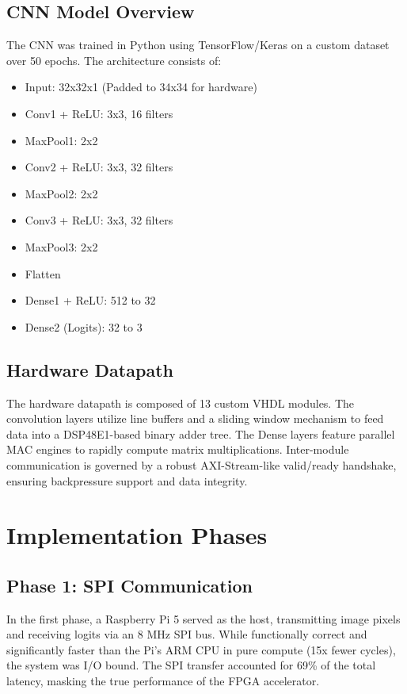 \documentclass[12pt,a4paper]{article}
\begin{document}
\subsection{CNN Model Overview}
The CNN was trained in Python using TensorFlow/Keras on a custom dataset over 50 epochs. The architecture consists of:
\begin{itemize}
    \item Input: 32x32x1 (Padded to 34x34 for hardware)
    \item Conv1 + ReLU: 3x3, 16 filters
    \item MaxPool1: 2x2
    \item Conv2 + ReLU: 3x3, 32 filters
    \item MaxPool2: 2x2
    \item Conv3 + ReLU: 3x3, 32 filters
    \item MaxPool3: 2x2
    \item Flatten
    \item Dense1 + ReLU: 512 to 32
    \item Dense2 (Logits): 32 to 3
\end{itemize}

\subsection{Hardware Datapath}
The hardware datapath is composed of 13 custom VHDL modules. 
The convolution layers utilize line buffers and a sliding window mechanism to feed data into a DSP48E1-based binary adder tree. The Dense layers feature parallel MAC engines to rapidly compute matrix multiplications. Inter-module communication is governed by a robust AXI-Stream-like valid/ready handshake, ensuring backpressure support and data integrity.

\section{Implementation Phases}

\subsection{Phase 1: SPI Communication}
In the first phase, a Raspberry Pi 5 served as the host, transmitting image pixels and receiving logits via an 8 MHz SPI bus. While functionally correct and significantly faster than the Pi's ARM CPU in pure compute (15x fewer cycles), the system was I/O bound. The SPI transfer accounted for 69\% of the total latency, masking the true performance of the FPGA accelerator.
\end{document}

